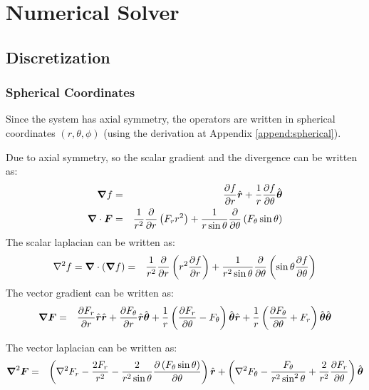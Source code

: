 \section{Numerical Solver}


\subsection{Discretization}
\subsubsection{Spherical Coordinates}
Since the system has axial symmetry, the operators are written in 
spherical coordinates $(r,\theta,\phi)$ 
(using the derivation at Appendix \ref{append:spherical}).

Due to axial symmetry, 
so the scalar gradient and the divergence can be written as:
\begin{eqnarray}
\boldsymbol{\nabla} f &=& \frac{\partial f}{\partial r}\hat{\boldsymbol{r}} + \frac{1}{r}\frac{\partial f}{\partial \theta}\hat{\boldsymbol{\theta}} \\
\boldsymbol{\nabla} \cdot \boldsymbol{F} &=& \frac{1}{r^2}\frac{\partial }{\partial r}\left(F_r r^2 \right) + 
               \frac{1}{r \sin\theta}\frac{\partial }{\partial \theta}\left(F_\theta \sin\theta\right)
\end{eqnarray}
The scalar laplacian can be written as:
\begin{eqnarray}
\nabla^2 f = \boldsymbol{\nabla} \cdot (\boldsymbol{\nabla} f)&=& 
 \frac{1}{r^2}\frac{\partial }{\partial r}\left(r^2 \frac{\partial f}{\partial r}\right) + 
 \frac{1}{r^2 \sin\theta}\frac{\partial }{\partial \theta}\left(\sin\theta \frac{\partial f}{\partial \theta}\right)
\end{eqnarray}
The vector gradient can be written as:
\begin{eqnarray}
\boldsymbol{\nabla} \boldsymbol{F} &=& \frac{\partial F_r}{\partial r} \hat{\boldsymbol{r}} \hat{\boldsymbol{r}} + \frac{\partial F_\theta}{\partial r} \hat{\boldsymbol{r}} \hat{\boldsymbol{\theta}} + 
\frac{1}{r}\left(\frac{\partial F_r}{\partial \theta} - F_\theta\right) \hat{\boldsymbol{\theta}} \hat{\boldsymbol{r}} + 
\frac{1}{r}\left(\frac{\partial F_\theta}{\partial \theta} + F_r\right) \hat{\boldsymbol{\theta}} \hat{\boldsymbol{\theta}}
\end{eqnarray}

The vector laplacian can be written as:
\begin{eqnarray}
\boldsymbol{\nabla}^2 \boldsymbol{F} &=& 
\left(\nabla^2 F_r - \frac{2F_r}{r^2} - 
\frac{2}{r^2 \sin\theta} \frac{\partial \left(F_\theta \sin\theta \right)}{\partial \theta}\right)\hat{\boldsymbol{r}}
+ \left(\nabla^2 F_\theta - \frac{F_\theta}{r^2 \sin^2\theta} + 
\frac{2}{r^2}\frac{\partial F_r}{\partial \theta}\right) \hat{\boldsymbol{\theta}}
\end{eqnarray}

